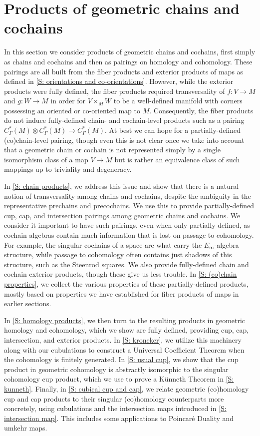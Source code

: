 
\section{Products of geometric chains and cochains}\label{S: products}

In this section we consider products of geometric chains and cochains, first simply as chains and cochains and then as pairings on homology and cohomology.
These pairings are all built from the fiber products and exterior products of maps as defined in \cref{S: orientations and co-orientations}.
However, while the exterior products were fully defined, the fiber products required transversality of $f \colon V \to M$ and $g \colon W \to M$ in order for $V \times_M W$ to be a well-defined manifold with corners possessing an oriented or co-oriented map to $M$.
Consequently, the fiber products do not induce fully-defined chain- and cochain-level products such as a pairing $C^*_\Gamma(M) \otimes C^*_\Gamma(M) \to C^*_\Gamma(M)$.
At best we can hope for a partially-defined (co)chain-level pairing, though even this is not clear once we take into account that a geometric chain or cochain is not represented simply by a single isomorphism class of a map $V \to M$ but is rather an equivalence class of such mappings up to triviality and degeneracy.

In \cref{S: chain products}, we address this issue and show that there is a natural notion of transversality among chains and cochains, despite the ambiguity in the representative prechains and precochains.
We use this to provide partially-defined cup, cap, and intersection pairings among geometric chains and cochains.
We consider it important to have such pairings, even when only partially defined, as cochain algebras contain much information that is lost on passage to cohomology.
For example, the singular cochains of a space are what carry the $E_\infty$-algebra structure, while passage to cohomology often contains just shadows of this structure, such as the Steenrod squares.
We also provide fully-defined chain and cochain exterior products, though these give us less trouble.
In \cref{S: (co)chain properties}, we collect the various properties of these partially-defined products, mostly based on properties we have established for fiber products of maps in earlier sections.

In \cref{S: homology products}, we then turn to the resulting products in geometric homology and cohomology, which we show are fully defined, providing cup, cap, intersection, and exterior products.
In \cref{S: kroneker}, we utilize this machinery along with our cubulations to construct a Universal Coefficient Theorem when the cohomology is finitely generated.
In \cref{S: usual cup}, we show that the cup product in geometric cohomology is abstractly isomorphic to the singular cohomology cup product, which we use to prove a K\"unneth Theorem in \cref{S: kunneth}.
Finally, in \cref{S: cubical cup and cap}, we relate geometric (co)homology cup and cap products to their singular (co)homology counterparts more concretely, using cubulations and the intersection maps introduced in \cref{S: intersection map}.
This includes some applications to Poincar\'e Duality and umkehr maps.

